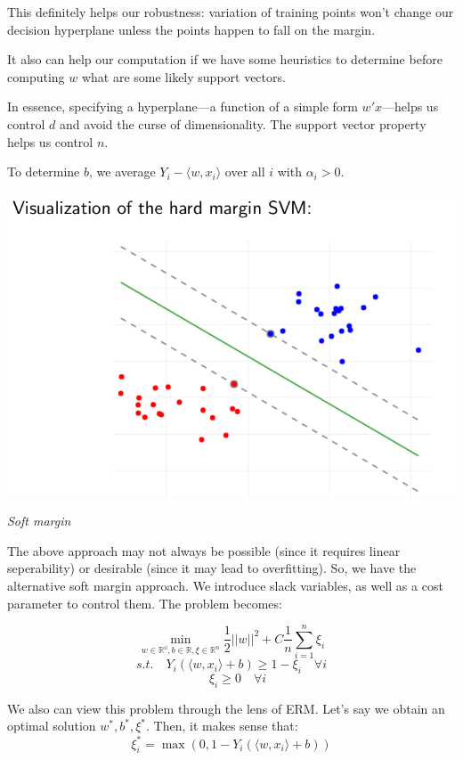\documentclass{minimal}
\begin{document}
This definitely helps our robustness: 
variation of training points won't change our decision hyperplane unless the
points happen to fall on the margin. 

It also can help our computation if we have
some heuristics to determine before computing $w$ what are some likely support
vectors.

In essence, specifying a hyperplane---a function of a simple form $w'x$---helps
us control $d$ and avoid the curse of dimensionality. The support vector
property helps us control $n$.

To determine $b$, we average $Y_i - \langle w, x_i \rangle$ over all $i$ with
$\alpha_i > 0$.

\includegraphics[scale=0.25]{svm1}

\medskip

\textit{Soft margin}

The above approach may not always be possible (since it requires linear
seperability) or desirable (since it may lead to overfitting). So, we have the
alternative soft margin approach. We introduce slack variables, as well as a 
cost parameter to control them. The problem becomes:

$$
\min_{w \in \mathbb{R^d}, b \in \mathbb{R}, \xi \in \mathbb{R}^n} 
\frac{1}{2} ||w||^2 + C \frac{1}{n} \sum_{i=1}^n \xi_i
$$
$$
s.t. \quad Y_i(\langle w, x_i \rangle + b) \geq 1 - \xi_i \quad \forall i
$$
$$
\quad \xi_i \geq 0 \quad \forall i
$$

We also can view this problem through the lens of ERM. Let's say we obtain an
optimal solution $w^*, b^*, \xi^*$. 
Then, it makes sense that:
$$
\xi_i^* = \max(0, 1 - Y_i(\langle w, x_i \rangle + b)) 
$$
\end{document}
